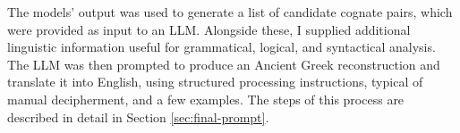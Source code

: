 The models’ output was used to generate a list of candidate cognate pairs, which were provided as input to an LLM.  
Alongside these, I supplied additional linguistic information useful for grammatical, logical, and syntactical analysis.  
The LLM was then prompted to produce an Ancient Greek reconstruction and translate it into English, using structured processing instructions, typical of manual decipherment, and a few examples.  
The steps of this process are described in detail in Section \ref{sec:final-prompt}.

